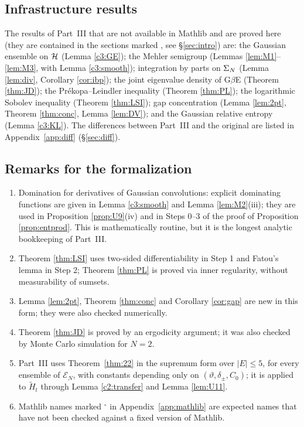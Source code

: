 \subsection{Infrastructure results}
The results of Part~III that are not available in Mathlib and are proved here (they are contained in the sections marked \INFRA, see \S\ref{sec:intro}) are: the Gaussian ensemble on $\mathcal{H}$ (Lemma \ref{c3:GE});
the Mehler semigroup (Lemmas \ref{lem:M1}--\ref{lem:M3}, with Lemma \ref{c3:smooth}); integration by parts on $\Sigma_N$ (Lemma \ref{lem:div}, Corollary \ref{cor:ibp}); the joint eigenvalue density of G$\beta$E (Theorem \ref{thm:JD});
the Pr\'ekopa--Leindler inequality (Theorem \ref{thm:PL}); the logarithmic Sobolev inequality (Theorem \ref{thm:LSI}); gap concentration (Lemma \ref{lem:2pt}, Theorem \ref{thm:conc}, Lemma \ref{lem:DV}); and the Gaussian relative entropy (Lemma \ref{c3:KL}).
The differences between Part~III and the original are listed in Appendix~\ref{app:diff} (\S\ref{sec:diff}).

\subsection{Remarks for the formalization}\label{sec:risks}
\begin{enumerate}[leftmargin=1.8em,itemsep=2pt]
\item Domination for derivatives of Gaussian convolutions: explicit dominating functions are given in Lemma \ref{c3:smooth} and Lemma \ref{lem:M2}(iii); they are used in Proposition \ref{prop:U9}(iv) and in Steps 0--3 of the proof of Proposition \ref{prop:entprod}. This is mathematically routine, but it is the longest analytic bookkeeping of Part~III.
\item Theorem \ref{thm:LSI} uses two-sided differentiability in Step 1 and Fatou's lemma in Step 2; Theorem \ref{thm:PL} is proved via inner regularity, without measurability of sumsets.
\item Lemma \ref{lem:2pt}, Theorem \ref{thm:conc} and Corollary \ref{cor:gap} are new in this form; they were also checked numerically.
\item Theorem \ref{thm:JD} is proved by an ergodicity argument; it was also checked by Monte Carlo simulation for $N=2$.
\item Part~III uses Theorem~\ref{thm:22} in the supremum form over $|E|\le5$, for every ensemble of $\mathcal E_N$, with constants depending only on $(\vartheta,\delta_\pm,C_0)$; it is applied to $\widetilde H_t$ through Lemma \ref{c2:transfer} and Lemma \ref{lem:U11}.
\item Mathlib names marked $^\circ$ in Appendix~\ref{app:mathlib} are expected names that have not been checked against a fixed version of Mathlib.
\end{enumerate}
